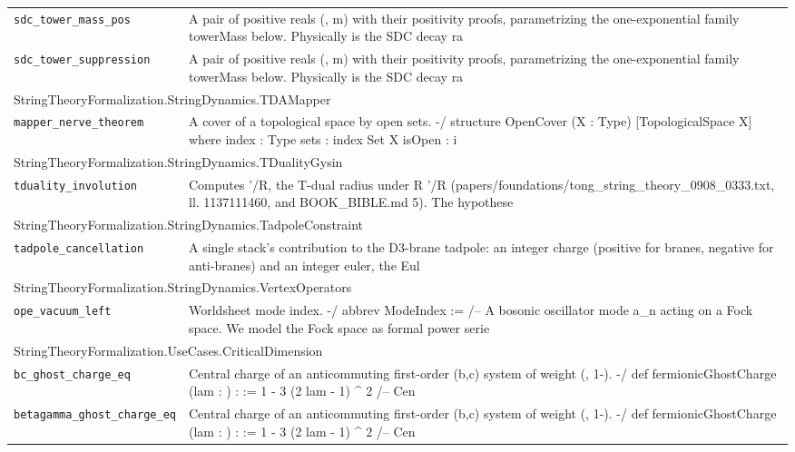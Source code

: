 \begin{longtable}{p{}p{}}
\quad\texttt{\footnotesize sdc\_tower\_mass\_pos} & {\footnotesize A pair of positive reals (, m) with their positivity proofs, parametrizing the one-exponential family towerMass below. Physically  is the SDC decay ra} \\
\quad\texttt{\footnotesize sdc\_tower\_suppression} & {\footnotesize A pair of positive reals (, m) with their positivity proofs, parametrizing the one-exponential family towerMass below. Physically  is the SDC decay ra} \\
\multicolumn{2}{l}{\textsf{\small StringTheoryFormalization.StringDynamics.TDAMapper}} \\
\quad\texttt{\footnotesize mapper\_nerve\_theorem} & {\footnotesize A cover of a topological space by open sets. -/ structure OpenCover (X : Type) [TopologicalSpace X] where index : Type sets : index  Set X isOpen :  i} \\
\multicolumn{2}{l}{\textsf{\small StringTheoryFormalization.StringDynamics.TDualityGysin}} \\
\quad\texttt{\footnotesize tduality\_involution} & {\footnotesize Computes '/R, the T-dual radius under R  '/R (papers/foundations/tong\_string\_theory\_0908\_0333.txt, ll. 1137111460, and BOOK\_BIBLE.md 5). The hypothese} \\
\multicolumn{2}{l}{\textsf{\small StringTheoryFormalization.StringDynamics.TadpoleConstraint}} \\
\quad\texttt{\footnotesize tadpole\_cancellation} & {\footnotesize A single stack's contribution to the D3-brane tadpole: an integer charge (positive for branes, negative for anti-branes) and an integer euler, the Eul} \\
\multicolumn{2}{l}{\textsf{\small StringTheoryFormalization.StringDynamics.VertexOperators}} \\
\quad\texttt{\footnotesize ope\_vacuum\_left} & {\footnotesize Worldsheet mode index. -/ abbrev ModeIndex :=  /-- A bosonic oscillator mode a\_n acting on a Fock space. We model the Fock space as formal power serie} \\
\multicolumn{2}{l}{\textsf{\small StringTheoryFormalization.UseCases.CriticalDimension}} \\
\quad\texttt{\footnotesize bc\_ghost\_charge\_eq} & {\footnotesize Central charge of an anticommuting first-order (b,c) system of weight (, 1-). -/ def fermionicGhostCharge (lam : ) :  := 1 - 3 (2 lam - 1) \^{} 2 /-- Cen} \\
\quad\texttt{\footnotesize betagamma\_ghost\_charge\_eq} & {\footnotesize Central charge of an anticommuting first-order (b,c) system of weight (, 1-). -/ def fermionicGhostCharge (lam : ) :  := 1 - 3 (2 lam - 1) \^{} 2 /-- Cen} \\

\end{longtable}
